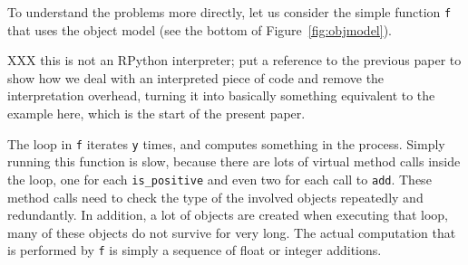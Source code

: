 \documentclass{sigplanconf}
\begin{document}
To understand the problems more directly, let us consider the simple function
\texttt{f} that uses the object model (see the bottom of
Figure~\ref{fig:objmodel}).

XXX this is not an RPython interpreter; put a reference to the previous
paper to show how we deal with an interpreted piece of code and remove
the interpretation overhead, turning it into basically something
equivalent to the example here, which is the start of the present paper.

The loop in \texttt{f} iterates \texttt{y} times, and computes something in the process.
Simply running this function is slow, because there are lots of virtual method
calls inside the loop, one for each \texttt{is\_positive} and even two for each
call to \texttt{add}. These method calls need to check the type of the involved
objects repeatedly and redundantly. In addition, a lot of objects are created
when executing that loop, many of these objects do not survive for very long.
The actual computation that is performed by \texttt{f} is simply a sequence of
float or integer additions.
\end{document}
